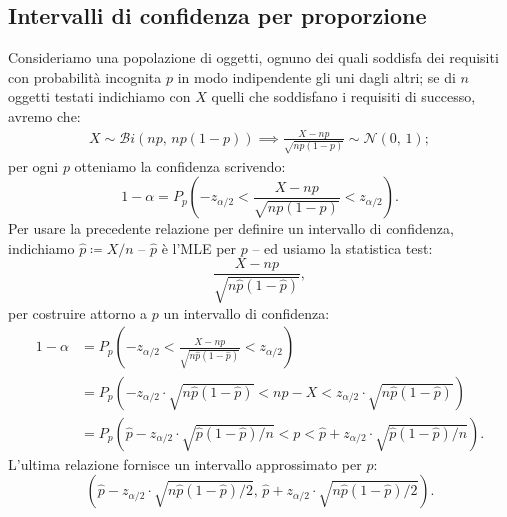        \subsection{Intervalli di confidenza per proporzione}
            \begin{defn}
                Consideriamo una popolazione di oggetti, ognuno dei quali soddisfa dei requisiti con 
                probabilità incognita $p$ in modo indipendente gli uni dagli altri; se di $n$ oggetti 
                testati indichiamo con $X$ quelli che soddisfano i requisiti di successo, avremo che:
                \begin{align*}
                    X \sim \mathcal{B}i(np,\,np(1-p)) \implies
                    \frac{X - np}{\sqrt{np(1-p)}} \sim \mathcal{N}(0,\,1)
                ;\end{align*}
                per ogni $p$ otteniamo la confidenza scrivendo: \[
                    1-\alpha = P_{p}\left(-z_{\alpha /2} < \frac{X -np}{\sqrt{np(1-p)}} < z_{\alpha /2}\right)
                .\]
                Per usare la precedente relazione per definire un intervallo di confidenza, indichiamo 
                $\hat{p}\coloneqq X /n$ \--- $\hat{p}$ è l'MLE per $p$ \--- ed usiamo la statistica 
                test: \[
                    \frac{X -np}{\sqrt{n\hat{p}(1-\hat{p})}}
                ,\] per costruire attorno a $p$ un intervallo di confidenza:
                \begin{align*}
                    1-\alpha &= P_{p}\left(-z_{\alpha /2} < \frac{X -np}{\sqrt{n\hat{p}(1-\hat{p})}} < 
                    z_{\alpha /2}\right) \\
                    &= P_{p}\left(-z_{\alpha /2}\cdot \sqrt{n\hat{p}(1-\hat{p})} < 
                    np-X < z_{\alpha /2}\cdot \sqrt{n\hat{p}(1-\hat{p})}\right) \\
                    &= P_{p}\left(\hat{p}- z_{\alpha /2}\cdot \sqrt{\hat{p}(1-\hat{p}) /n} < 
                    p < \hat{p}+ z_{\alpha /2}\cdot \sqrt{\hat{p}(1-\hat{p}) /n}\right)
                .\end{align*}
                L'ultima relazione fornisce un intervallo approssimato per $p$: \[
                    \left(\hat{p}- z_{\alpha /2}\cdot \sqrt{n\hat{p}(1-\hat{p}) /2},\, 
                    \hat{p}+ z_{\alpha /2}\cdot \sqrt{n\hat{p}(1-\hat{p}) /2}\right)
                .\] 
            \end{defn}

